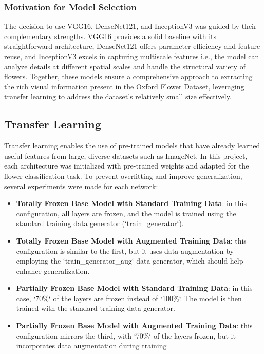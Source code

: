 \subsubsection*{Motivation for Model Selection}
The decision to use VGG16, DenseNet121, and InceptionV3 was guided by their complementary strengths. VGG16 provides a
solid baseline with its straightforward architecture, DenseNet121 offers parameter efficiency and feature reuse, and
InceptionV3 excels in capturing multiscale features i.e., the model can analyze details at different spatial scales and
handle the structural variety of flowers. Together, these models ensure a comprehensive approach to extracting the rich
visual information present in the Oxford Flower Dataset, leveraging transfer learning to address the dataset's relatively
small size effectively.

\subsection{Transfer Learning}

Transfer learning enables the use of pre-trained models that have already learned useful features from large, diverse
datasets such as ImageNet. In this project, each architecture was initialized with pre-trained weights and adapted for
the flower classification task. To prevent overfitting and improve generalization, several experiments were made for each network:

\begin{itemize}
    \item \textbf{Totally Frozen Base Model with Standard Training Data}: in this configuration, all layers are frozen, and the model is trained using the standard training data generator (`train\_generator`).
    \item \textbf{Totally Frozen Base Model with Augmented Training Data}: this configuration is similar to the first, but it uses data augmentation by employing the `train\_generator\_aug` data generator, which should help enhance generalization.
    \item \textbf{Partially Frozen Base Model with Standard Training Data}: in this case, `70\%` of the layers are frozen instead of `100\%`. The model is then trained with the standard training data generator.
    \item \textbf{Partially Frozen Base Model with Augmented Training Data}: this configuration mirrors the third, with `70\%` of the layers frozen, but it incorporates data augmentation during training
\end{itemize}

